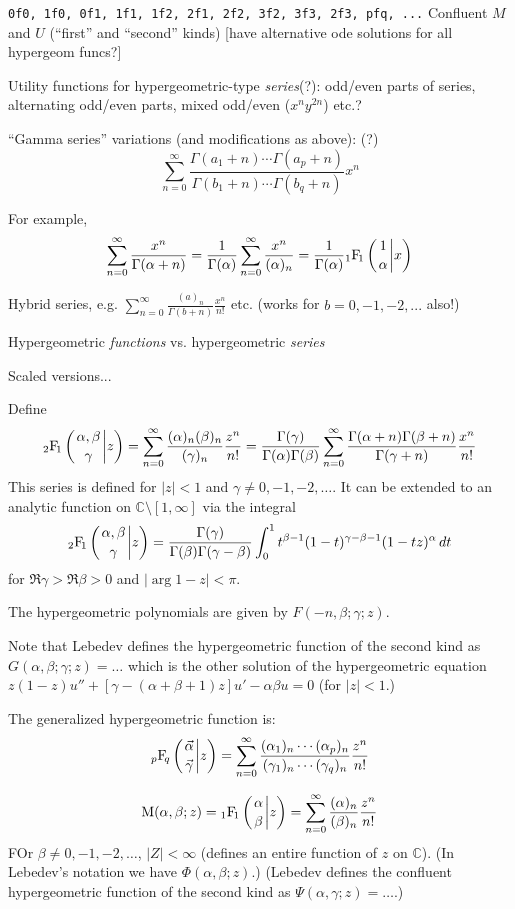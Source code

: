 \documentclass[10pt,dvipdfmx,letterpaper,twoside]{article}
\let\O=\operatorname
\newcommand{\CC}{{\mathbb{C}}}
\newcommand{\Hyper}[5]{{\mathop{{}_{#1}\!\O{F\!}_{#2}\left({\genfrac{}{}{0pt}{}{#3}{#4}}\middle|{#5}\right)}}}
\let\al=\alpha
\let\gam=\gamma
\let\Gam=\Gamma
\begin{document}
{\tt 0f0, 1f0, 0f1, 1f1, 1f2, 2f1, 2f2, 3f2, 3f3, 2f3, pfq, ...}
Confluent $M$ and $U$ (``first'' and ``second'' kinds) [have alternative ode solutions for all hypergeom funcs?]

Utility functions for hypergeometric-type {\em series}(?): odd/even parts of series, alternating odd/even parts, 
mixed odd/even ($x^n y^{2n}$) etc.?

``Gamma series'' variations (and modifications as above): (?)
\[ \sum_{n=0}^\infty \frac{\Gam(a_1+n)\cdots\Gam(a_p+n)}{\Gam(b_1+n)\cdots\Gam(b_q+n)} x^n \]

For example,
\[ \sum_{n=0}^\infty\frac{x^n}{\Gam(\al+n)} = \frac{1}{\Gam(\al)}\sum_{n=0}^\infty\frac{x^n}{(\al)_n}
    = \frac{1}{\Gam(\al)} \Hyper{1}{1}{1}{\al}{x} \]

Hybrid series, e.g. $\sum_{n=0}^\infty \frac{(a)_n}{\Gam(b+n)}\frac{x^n}{n!}$ etc. (works for $b=0,-1,-2,...$ also!)

Hypergeometric {\em functions} vs. hypergeometric {\em series}

Scaled versions...

Define
\[ \Hyper{2}{1}{\al, \beta}{\gam}{z} = \sum_{n=0}^\infty \frac{(\al)_n (\beta)_n}{(\gam)_n} \frac{z^n}{n!}
    = \frac{\Gam(\gam)}{\Gam(\al)\Gam(\beta)}\sum_{n=0}^\infty \frac{\Gam(\al+n)\Gam(\beta+n)}{\Gam(\gam+n)} \frac{x^n}{n!} \]
This series is defined for $|z|<1$ and $\gam\neq0,-1,-2,\dots$.  It can be extended to an analytic function
on $\CC\setminus[1,\infty]$ via the integral
\[ \Hyper{2}{1}{\al, \beta}{\gam}{z} = \frac{\Gam(\gam)}{\Gam(\beta)\Gam(\gam-\beta)}\int_0^1 t^{\beta-1}(1-t)^{\gam-\beta-1}(1-tz)^{\al}\,dt \]
for $\Re\gam>\Re\beta>0$ and $|\arg 1-z|<\pi$.

The hypergeometric polynomials are given by $F(-n,\beta;\gam;z)$.

Note that Lebedev defines the hypergeometric function of the second kind as $G(\al,\beta;\gam;z) = \dots$ which is the
other solution of the hypergeometric equation $z(1-z)u'' + [\gam-(\al+\beta+1)z]u' - \al\beta u=0$ (for $|z|<1$.)

The generalized hypergeometric function is:
\[ \Hyper{p}{q}{\vec{\al}}{\vec{\gam}}{z} = \sum_{n=0}^\infty \frac{(\al_1)_n\cdots(\al_p)_n}{(\gam_1)_n\cdots(\gam_q)_n} \frac{z^n}{n!} \]

\[ \O{M}(\al, \beta; z) = \Hyper{1}{1}{\al}{\beta}{z} = \sum_{n=0}^\infty \frac{(\al)_n}{(\beta)_n} \frac{z^n}{n!} \]
FOr $\beta\neq0,-1,-2,\dots$, $|Z|<\infty$ (defines an entire function of $z$ on $\CC$).
(In Lebedev's notation we have $\Phi(\al,\beta;z)$.)
(Lebedev defines the confluent hypergeometric function of the second kind as $\Psi(\al,\gam;z) = \dots$.)
\end{document}

